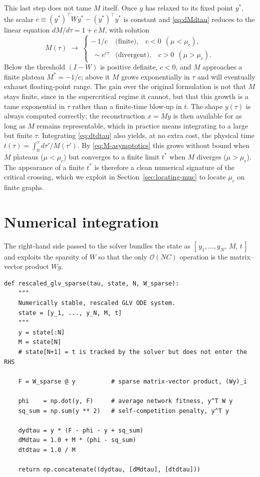 This last step does not tame $M$ itself. Once
$y$ has relaxed to its fixed point $y^\ast$, the scalar
$c \equiv (y^\ast)^{\!\top} W y^\ast - (y^\ast)^{\!\top} y^\ast$ is constant and
\eqref{eq:dMdtau} reduces to the linear equation $dM/d\tau = 1 + c\,M$, with
solution
\begin{equation}
    M(\tau) \;\longrightarrow\;
    \begin{cases}
        -\,1/c & \text{(finite),} \quad c < 0 \ \ (\mu < \mu_c), \\[2pt]
        \ \sim e^{c\tau} & \text{(divergent),} \quad c > 0 \ \ (\mu > \mu_c).
    \end{cases}
    \label{eq:M-asymptotics}
\end{equation}
Below the threshold $(I-W)$ is positive definite, $c<0$, and $M$ approaches a
finite plateau $M^\ast = -1/c$; above it $M$ grows exponentially in $\tau$ and
will eventually exhaust floating-point range. The gain over the original
formulation is not that $M$ stays finite, since in the supercritical regime it
cannot, but that this growth is a tame exponential in $\tau$ rather than a
finite-time blow-up in $t$. The shape $y(\tau)$ is always computed correctly; the
reconstruction $x = My$ is then available for as long as $M$ remains
representable, which in practice means integrating to a large but finite $\tau$.
Integrating \eqref{eq:dtdtau} also yields, at no extra cost, the physical time
$t(\tau) = \int_0^\tau d\tau'/M(\tau')$. By \eqref{eq:M-asymptotics} this grows
without bound when $M$ plateaus ($\mu<\mu_c$) but converges to a finite limit
$t^\ast$ when $M$ diverges ($\mu>\mu_c$). The appearance of a finite $t^\ast$ is
therefore a clean numerical signature of the critical crossing, which we exploit
in Section~\ref{sec:locating-muc} to locate $\mu_c$ on finite graphs.

\section{Numerical integration}
\label{sec:numerical-integration}

The right-hand side passed to the solver bundles the state as
$[\,y_1,\dots,y_N,\,M,\,t\,]$ and exploits the sparsity of $W$ so that the only
$\mathcal{O}(NC)$ operation is the matrix--vector product $Wy$.

\begin{verbatim}
def rescaled_glv_sparse(tau, state, N, W_sparse):
    """
    Numerically stable, rescaled GLV ODE system.
    state = [y_1, ..., y_N, M, t]
    """
    y = state[:N]
    M = state[N]
    # state[N+1] = t is tracked by the solver but does not enter the RHS

    F = W_sparse @ y          # sparse matrix-vector product, (Wy)_i

    phi    = np.dot(y, F)     # average network fitness, y^T W y
    sq_sum = np.sum(y ** 2)   # self-competition penalty, y^T y

    dydtau = y * (F - phi - y + sq_sum)
    dMdtau = 1.0 + M * (phi - sq_sum)
    dtdtau = 1.0 / M

    return np.concatenate((dydtau, [dMdtau], [dtdtau]))
\end{verbatim}

